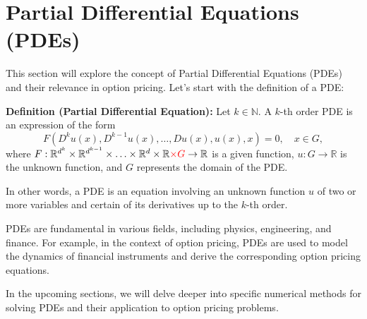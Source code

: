 \section{Partial Differential Equations (PDEs)}

This section will explore the concept of Partial Differential Equations (PDEs) and their relevance in option pricing. Let's start with the definition of a PDE:

\textbf{Definition (Partial Differential Equation):}
Let $k \in \mathbb{N}$. A $k$-th order PDE is an expression of the form
\[F(D^k u(x), D^{k-1} u(x), \ldots, Du(x), u(x), x) = 0, \quad x \in G,\]
where $F : \mathbb{R}^{d^k} \times \mathbb{R}^{d^{k-1}} \times \ldots \times \mathbb{R}^d \times \mathbb{R} \textcolor{red}{\times G} \rightarrow \mathbb{R}$ is a given function, $u : G \rightarrow \mathbb{R}$ is the unknown function, and $G$ represents the domain of the PDE.

In other words, a PDE is an equation involving an unknown function $u$ of two or more variables and certain of its derivatives up to the $k$-th order.

PDEs are fundamental in various fields, including physics, engineering, and finance. For example, in the context of option pricing, PDEs are used to model the dynamics of financial instruments and derive the corresponding option pricing equations.

In the upcoming sections, we will delve deeper into specific numerical methods for solving PDEs and their application to option pricing problems.

